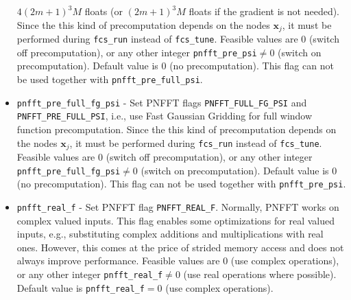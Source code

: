 \begin{itemize}
    $4(2m+1)^3M$ floats (or $(2m+1)^3M$ floats if the gradient is not needed).
    Since the this kind of precomputation depends on the nodes $\mathbf x_j$, it must be performed during \verb!fcs_run! instead of \verb!fcs_tune!.
    Feasible values are $0$ (switch off precomputation), or any other integer \verb!pnfft_pre_psi!$\ne0$ (switch on precomputation).
    Default value is $0$ (no precomputation). This flag can not be used together with \verb!pnfft_pre_full_psi!.
  \item \verb!pnfft_pre_full_fg_psi! -
    Set PNFFT flags \verb!PNFFT_FULL_FG_PSI! and \verb!PNFFT_PRE_FULL_PSI!, i.e., use Fast Gaussian Gridding for full window function precomputation.
    Since the this kind of precomputation depends on the nodes $\mathbf x_j$, it must be performed during \verb!fcs_run! instead of \verb!fcs_tune!.
    Feasible values are $0$ (switch off precomputation), or any other integer \verb!pnfft_pre_full_fg_psi!$\ne0$ (switch on precomputation).
    Default value is $0$ (no precomputation). This flag can not be used together with \verb!pnfft_pre_psi!.
  \item \verb!pnfft_real_f! -
    Set PNFFT flag \verb!PNFFT_REAL_F!. Normally, PNFFT works on complex valued inputs. This flag enables some optimizations for real valued inputs, e.g., substituting complex additions and multiplications with real ones.
    However, this comes at the price of strided memory access and does not always improve performance.
    Feasible values are $0$ (use complex operations), or any other integer \verb!pnfft_real_f!$\ne0$ (use real operations where possible).
    Default value is \verb!pnfft_real_f!$=0$ (use complex operations).
\end{itemize}

